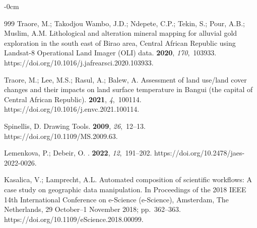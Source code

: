 \documentclass[minerals,article,accept,pdftex,moreauthors]{Definitions/mdpi}
\begin{document}
\begin{adjustwidth}{-\extralength}{0cm}
\begin{thebibliography}{999}
Traore, M.; {Takodjou Wambo}, J.D.; Ndepete, C.P.; Tekin, S.; Pour, A.B.;
  Muslim, A.M.
\newblock Lithological and alteration mineral mapping for alluvial gold
  exploration in the south east of Birao area, Central African Republic using
  Landsat-8 Operational Land Imager (OLI) data.
 {\bf 2020}, {\em
  170},~103933.
\newblock https://doi.org/10.1016/j.jafrearsci.2020.103933.


Traore, M.; Lee, M.S.; Rasul, A.; Balew, A.
\newblock Assessment of land use/land cover changes and their impacts on land
  surface temperature in Bangui (the capital of Central African Republic).
 {\bf 2021}, {\em 4},~100114.
\newblock https://doi.org/10.1016/j.envc.2021.100114.

Spinellis, D.
\newblock Drawing Tools.
 {\bf 2009}, {\em 26},~12--13.
\newblock https://doi.org/10.1109/MS.2009.63.

Lemenkova, P.; Debeir, O.
.
 {\bf 2022}, {\em
  12},~191--202.
\newblock https://doi.org/10.2478/jaes-2022-0026.

Kasalica, V.; Lamprecht, A.L.
\newblock Automated composition of scientific workflows: A case study on
  geographic data manipulation.
\newblock In Proceedings of the 2018 IEEE 14th International Conference on
  e-Science (e-Science), Amsterdam, The Netherlands, 29 October--1 November 2018; pp.~362--363. %
\newblock https://doi.org/10.1109/eScience.2018.00099.


\end{thebibliography}
\end{adjustwidth}
\end{document}
